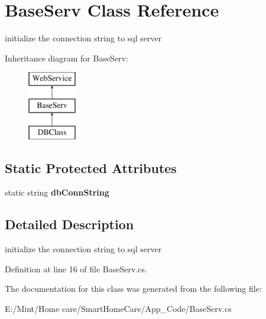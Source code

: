 \hypertarget{class_base_serv}{\section{Base\-Serv Class Reference}
\label{class_base_serv}
}


initialize the connection string to sql server  


Inheritance diagram for Base\-Serv\-:\begin{figure}[H]
\begin{center}
\leavevmode
\includegraphics[height=3.000000cm]{class_base_serv}
\end{center}
\end{figure}
\subsection*{Static Protected Attributes}
\begin{DoxyCompactItemize}
\item 
\hypertarget{class_base_serv_a5ddc620c33beaae6c2e76912576d6c52}{static string {\bfseries db\-Conn\-String}}\label{class_base_serv_a5ddc620c33beaae6c2e76912576d6c52}

\end{DoxyCompactItemize}


\subsection{Detailed Description}
initialize the connection string to sql server 

Definition at line 16 of file Base\-Serv.\-cs.



The documentation for this class was generated from the following file\-:\begin{DoxyCompactItemize}
\item 
E\-:/\-Mint/\-Home care/\-Smart\-Home\-Care/\-App\-\_\-\-Code/Base\-Serv.\-cs\end{DoxyCompactItemize}
